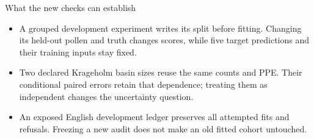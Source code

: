 \begin{frame}{What the new checks can establish}
\begin{itemize}
\item A grouped development experiment writes its split before fitting. Changing its held-out pollen and truth changes scores, while five target predictions and their training inputs stay fixed.
\item Two declared Krageholm basin sizes reuse the same counts and PPE. Their conditional paired errors retain that dependence; treating them as independent changes the uncertainty question.
\item An exposed English development ledger preserves all attempted fits and refusals. Freezing a new audit does not make an old fitted cohort untouched.
\end{itemize}
\end{frame}


